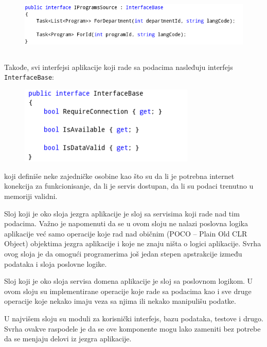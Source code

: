 \documentclass[a4paper]{article}
\begin{document}
\bigskip



\begin{figure}
\centering
\includegraphics[width=153.21mm,height=28.82mm]{msc-img33.png}
\end{figure}
Takođe, svi interfejsi aplikacije koji rade sa podacima nasleđuju
interfejs \texttt{\textcolor[rgb]{0.0,0.4,0.8}{InterfaceBase}}:



\begin{figure}
\centering
\includegraphics[width=83.7mm,height=37.17mm]{msc-img34.png}
\end{figure}
koji definiše neke zajedničke osobine kao što su da li je potrebna
internet konekcija za funkcionisanje, da li je servis dostupan, da li
su podaci trenutno u memoriji validni.

Sloj koji je oko sloja jezgra aplikacije je sloj sa servisima koji rade
nad tim podacima. Važno je napomenuti da se u ovom sloju ne nalazi
poslovna logika aplikacije već samo operacije koje rad nad običnim
(POCO – Plain Old CLR Object) objektima jezgra aplikacije i koje ne
znaju ništa o logici aplikacije. Svrha ovog sloja je da omogući
programerima još jedan stepen apstrakcije između podataka i sloja
poslovne logike.

Sloj koji je oko sloja servisa domena aplikacije je sloj sa poslovnom
logikom. U ovom sloju su implementirane operacije koje rade sa podacima
kao i sve druge operacije koje nekako imaju veza sa njima ili nekako
manipulišu podatke. 

U najvišem sloju su moduli za korisnički interfejs, bazu podataka,
testove i drugo. Svrha ovakve raspodele je da se ove komponente mogu
lako zameniti bez potrebe da se menjaju delovi iz jezgra aplikacije.
\end{document}
